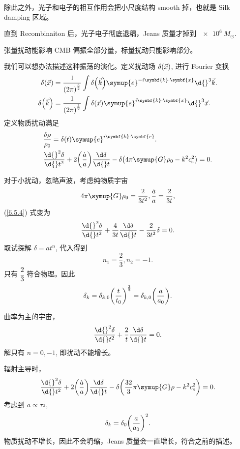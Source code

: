 \documentclass[../天体物理基础.tex]{subfiles}
\begin{document}
除此之外，光子和电子的相互作用会把小尺度结构 smooth 掉，也就是 Silk damping 区域。

直到 Recombinaiton 后，光子电子彻底退耦，Jeans 质量才掉到 $\qty{e6}{M_{\odot}}$.

张量扰动能影响 CMB 偏振全部分量，标量扰动只能影响部分。

我们可以想办法描述这种振荡的演化。定义扰动场 $\delta\mleft(\vec{x}\mright)$, 进行 Fourier 变换
\begin{align}
\delta\mleft(\vec{x}\mright)&=\frac{1}{\mleft(2\pi\mright)^{\frac{3}{2}}}\int\delta\mleft(\vec{k}\mright)\symup{e}^{-i\symbf{k}\cdot\symbf{x}}\d{}^{3}\vec{k}.\\
\delta\mleft(\vec{k}\mright)&=\frac{1}{\mleft(2\pi\mright)^{\frac{3}{2}}}\int\delta\mleft(\vec{x}\mright)\symup{e}^{i\symbf{k}\cdot\symbf{x}}\d{}^{3}\vec{x}.
\end{align}
定义物质扰动满足
\begin{align}
&\frac{\delta\rho}{\rho_{0}}=\delta\mleft(t\mright)\symup{e}^{i\symbf{k}\cdot\symbf{r}}.\\
&\frac{\d{}^{2}\delta}{\d{}t^{2}}+2\mleft(\frac{\dot a}{a}\mright)\frac{\d\delta}{\d{}t}-\delta\mleft(4\pi\symup{G}\rho_{0}-k^{2}c_{\mathrm{s}}^{2}\mright)=0.\label{6.5.4}
\end{align}

对于小扰动，忽略声波，考虑纯物质宇宙
\begin{equation}
4\pi\symup{G}\rho_{0}=\frac{2}{3t^{2}},\frac{\dot a}{a}=\frac{2}{3t},
\end{equation}
(\ref{6.5.4}) 式变为
\begin{equation}
\frac{\d{}^{2}\delta}{\d{}t^{2}}+\frac{4}{3t}\frac{\d\delta}{\d{}t}-\frac{2}{3t^{2}}\delta=0.
\end{equation}
取试探解 $\delta=at^{n}$, 代入得到
\begin{equation}
n_{1}=\frac{2}{3}, n_{2}=-1.
\end{equation}
只有 $\dfrac{2}{3}$ 符合物理。因此
\begin{equation}
\delta_{k}=\delta_{k, 0}\mleft(\frac{t}{t_{0}}\mright)^{\frac{2}{3}}=\delta_{k, 0}\mleft(\frac{a}{a_{0}}\mright).
\end{equation}

曲率为主的宇宙，
\begin{equation}
\frac{\d{}^{2}\delta}{\d{}t^{2}}+\frac{2}{t}\frac{\d\delta}{\d{}t}=0.
\end{equation}
解只有 $n=0,-1$, 即扰动不能增长。

辐射主导时，
\begin{equation}
\frac{\d{}^{2}\delta}{\d{}t^{2}}+2\mleft(\frac{\dot a}{a}\mright)\frac{\d\delta}{\d{}t}-\delta\mleft(\frac{32}{3}\pi\symup{G}\rho-k^{2}c_{\mathrm{s}}^{2}\mright)=0.
\end{equation}
考虑到 $a\propto\tau^{\frac{1}{2}}$,
\begin{equation}
\delta_{k}=\delta_{0}\mleft(\frac{a}{a_{0}}\mright)^{2}.
\end{equation}
物质扰动不增长，因此不会坍缩，Jeans 质量会一直增长，符合之前的描述。
\end{document}
